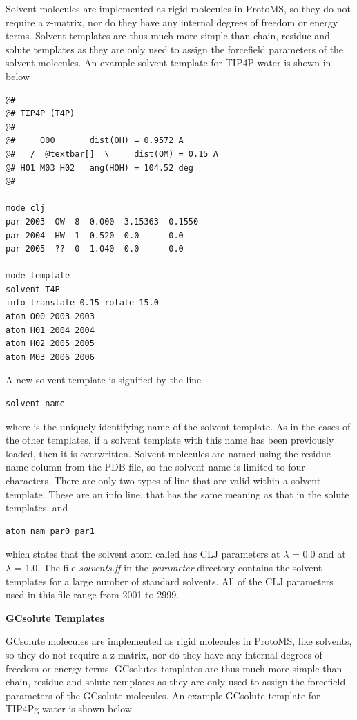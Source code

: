 \documentclass[letterpaper,10pt,english]{manual}
\begin{document}
Solvent molecules are implemented as rigid molecules in ProtoMS, so they do not require a z-matrix, nor do they have any internal degrees of freedom or energy terms. Solvent templates are thus much more simple than chain, residue and solute templates as they are only used to assign the forcefield parameters of the solvent molecules. An example solvent template for TIP4P water is shown in below

\begin{Verbatim}[commandchars=@\[\]]
@#
@# TIP4P (T4P)
@#
@#     O00       dist(OH) = 0.9572 A
@#   /  @textbar[]  \     dist(OM) = 0.15 A
@# H01 M03 H02   ang(HOH) = 104.52 deg
@#

mode clj
par 2003  OW  8  0.000  3.15363  0.1550
par 2004  HW  1  0.520  0.0      0.0
par 2005  ??  0 -1.040  0.0      0.0

mode template
solvent T4P
info translate 0.15 rotate 15.0
atom O00 2003 2003
atom H01 2004 2004
atom H02 2005 2005
atom M03 2006 2006
\end{Verbatim}

A new solvent template is signified by the line

\begin{Verbatim}[commandchars=@\[\]]
solvent name
\end{Verbatim}

where  is the uniquely identifying name of the solvent template. As in the cases of the other templates, if a solvent template with this name has been previously loaded, then it is overwritten. Solvent molecules are named using the residue name column from the PDB file, so the solvent name is limited to four characters. There are only two types of line that are valid within a solvent template. These are an info line, that has the same meaning as that in the solute templates, and

\begin{Verbatim}[commandchars=@\[\]]
atom nam par0 par1
\end{Verbatim}

which states that the solvent atom called  has CLJ parameters  at $\lambda$ = 0.0 and  at $\lambda$ = 1.0. The file \emph{solvents.ff} in the \emph{parameter} directory contains the solvent templates for a large number of standard solvents. All of the CLJ parameters used in this file range from 2001 to 2999.

\textbf{GCsolute Templates}

GCsolute molecules are implemented as rigid molecules in ProtoMS, like solvents, so they do not require a z-matrix, nor do they have any internal degrees of freedom or energy terms. GCsolutes templates are thus much more simple than chain, residue and solute templates as they are only used to assign the forcefield parameters of the GCsolute molecules. An example GCsolute template for TIP4Pg water is shown below
\end{document}
